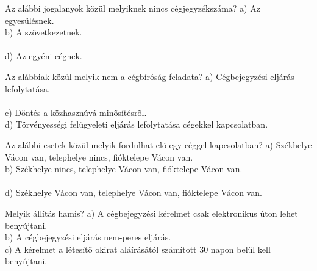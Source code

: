 \begin{frame}

\begin{tcolorbox}[title={94. Kérdés}]
Az alábbi jogalanyok közül melyiknek nincs cégjegyzékszáma?
\tcblower
a) Az egyesülésnek.\\
b) A szövetkezetnek.\\
\\
d) Az egyéni cégnek.
\end{tcolorbox}

\begin{tcolorbox}[title={95. Kérdés}]
Az alábbiak közül melyik nem a cégbíróság feladata?
\tcblower
a) Cégbejegyzési eljárás lefolytatása.\\
\\
c) Döntés a közhasznúvá minõsítésrõl.\\
d) Törvényességi felügyeleti eljárás lefolytatása cégekkel kapcsolatban.
\end{tcolorbox}

\begin{tcolorbox}[title={96. Kérdés}]
Az alábbi esetek közül melyik fordulhat elõ egy céggel kapcsolatban?
\tcblower
a) Székhelye Vácon van, telephelye nincs, fióktelepe Vácon van.\\
b) Székhelye nincs, telephelye Vácon van, fióktelepe Vácon van.\\
\\
d) Székhelye Vácon van, telephelye Vácon van, fióktelepe Vácon van.
\end{tcolorbox}

\begin{tcolorbox}[title={97. Kérdés}]
Melyik állítás hamis?
\tcblower
a) A cégbejegyzési kérelmet csak elektronikus úton lehet benyújtani.\\
b) A cégbejegyzési eljárás nem-peres eljárás. \\
c) A kérelmet a létesítõ okirat aláírásától számított 30 napon belül kell benyújtani.\\
\end{tcolorbox}

\end{frame}


